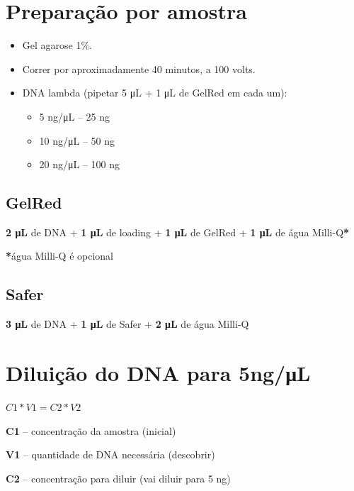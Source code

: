 \documentclass[
  letterpaper,
  DIV=11,
  numbers=noendperiod]{scrreprt}
\begin{document}
\hypertarget{preparauxe7uxe3o-por-amostra}{%
\section{Preparação por amostra}\label{preparauxe7uxe3o-por-amostra}}

\begin{itemize}
\item
  Gel agarose 1\%.
\item
  Correr por aproximadamente 40 minutos, a 100 volts.
\item
  DNA lambda (pipetar 5 μL + 1 μL de GelRed em cada um):

  \begin{itemize}
  \item
    5 ng/μL -- 25 ng
  \item
    10 ng/μL -- 50 ng
  \item
    20 ng/μL -- 100 ng
  \end{itemize}
\end{itemize}

\hypertarget{gelred-1}{%
\subsection{GelRed}\label{gelred-1}}

\textbf{2 μL} de DNA + \textbf{1 μL} de loading + \textbf{1 μL} de
GelRed + \textbf{1 μL} de água Milli-Q\textbf{*}

\textbf{*}água Milli-Q é opcional

\hypertarget{safer}{%
\subsection{Safer}\label{safer}}

\textbf{3 μL} de DNA + \textbf{1 μL} de Safer + \textbf{2 μL} de água
Milli-Q

\hypertarget{diluiuxe7uxe3o-do-dna-para-5ngux3bcl}{%
\section{Diluição do DNA para
5ng/μL}\label{diluiuxe7uxe3o-do-dna-para-5ngux3bcl}}

\(C1 * V1 = C2 * V2\)

\textbf{C1} -- concentração da amostra (inicial)

\textbf{V1} -- quantidade de DNA necessária (descobrir)

\textbf{C2} -- concentração para diluir (vai diluir para 5 ng)
\end{document}
